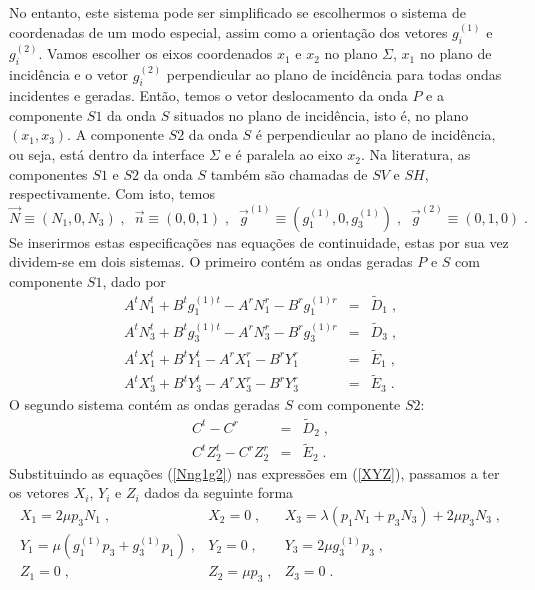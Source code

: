 No entanto, este sistema pode ser simplificado se escolhermos o
sistema de coordenadas de um modo especial, assim como a
orienta\c{c}\~ao dos vetores $g_i^{(1)}$ e $g_i^{(2)}$. Vamos
escolher os eixos coordenados $x_1$ e $x_2$ no plano $\Sigma$,
$x_1$ no plano de incid\^encia e o vetor $g_i^{(2)}$ perpendicular
ao plano de incid\^encia para todas ondas incidentes e geradas.
Ent\~ao, temos o vetor deslocamento da onda $P$ e a componente
$S1$ da onda $S$ situados no plano de incid\^encia, isto \'e, no
plano $(x_1,x_3)$. A componente $S2$ da onda $S$ \'e perpendicular
ao plano de incid\^encia, ou seja, est\'a dentro da interface
$\Sigma$ e \'e paralela ao eixo $x_2$. Na literatura, as
componentes $S1$ e $S2$ da onda $S$ tamb\'em s\~ao chamadas de
$SV$ e $SH$, respectivamente. Com isto, temos
\begin{equation}
\vec{N}\equiv(N_1,0,N_3) \;, \;\; \vec{n}\equiv(0,0,1) \;, \;\;
\vec{g}^{(1)}\equiv(g_1^{(1)},0,g_3^{(1)}) \;, \;\;
\vec{g}^{(2)}\equiv(0,1,0) \;. \label{Nng1g2}
\end{equation}
Se inserirmos estas especifica\c{c}\~oes nas equa\c{c}\~oes de
continuidade, estas por sua vez dividem-se em dois sistemas. O
primeiro cont\'em as ondas geradas $P$ e $S$ com componente $S1$,
dado por
\begin{equation}
\begin{array}{rcl}
A^tN_1^t+B^tg_1^{(1)t}-A^rN_1^r-B^rg_1^{(1)r} & = & \tilde{D}_1 \;, \\
A^tN_3^t+B^tg_3^{(1)t}-A^rN_3^r-B^rg_3^{(1)r} & = & \tilde{D}_3 \;, \\
A^tX_1^t+B^tY_1^t-A^rX_1^r-B^rY_1^r & = & \tilde{E}_1 \;, \\
A^tX_3^t+B^tY_3^t-A^rX_3^r-B^rY_3^r & = & \tilde{E}_3 \;.
\end{array}
\label{sist1}
\end{equation}
O segundo sistema cont\'em as ondas geradas $S$ com componente
$S2$:
\begin{equation}
\begin{array}{rcl}
C^t-C^r & = & \tilde{D}_2 \;, \\
C^tZ_2^t-C^rZ_2^r & = & \tilde{E}_2 \;.
\end{array}
\label{sist2}
\end{equation}
Substituindo as equa\c{c}\~oes (\ref{Nng1g2}) nas express\~oes em
(\ref{XYZ}), passamos a ter os vetores $X_i$, $Y_i$ e $Z_i$ dados
da seguinte forma
\begin{equation}
\begin{array}{lll}
X_1=2\mu p_3N_1\;, & X_2=0\;, & X_3=\lambda(p_1N_1+p_3N_3)+2\mu p_3N_3\;, \\
Y_1=\mu(g_1^{(1)}p_3+g_3^{(1)}p_1)\;, & Y_2=0\;, & Y_3=2\mu
g_3^{(1)} p_3\;, \\
Z_1=0\;, & Z_2=\mu p_3\;, & Z_3=0\;.
\end{array}
\label{sist3}
\end{equation}
